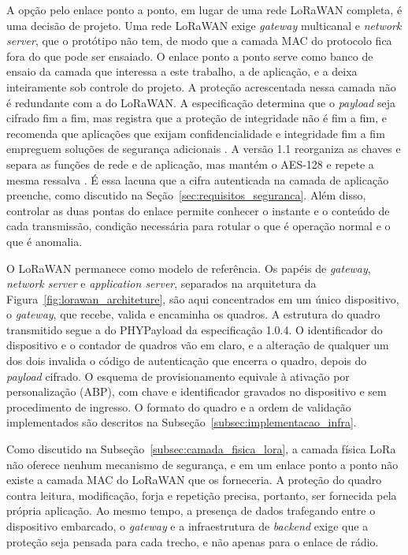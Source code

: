 A opção pelo enlace ponto a ponto, em lugar de uma rede LoRaWAN completa, é uma decisão de projeto. Uma rede LoRaWAN exige \textit{gateway} multicanal e \textit{network server}, que o protótipo não tem, de modo que a camada MAC do protocolo fica fora do que pode ser ensaiado. O enlace ponto a ponto serve como banco de ensaio da camada que interessa a este trabalho, a de aplicação, e a deixa inteiramente sob controle do projeto. A proteção acrescentada nessa camada não é redundante com a do LoRaWAN. A especificação determina que o \textit{payload} seja cifrado fim a fim, mas registra que a proteção de integridade não é fim a fim, e recomenda que aplicações que exijam confidencialidade e integridade fim a fim empreguem soluções de segurança adicionais \cite{lorawan104}. A versão 1.1 reorganiza as chaves e separa as funções de rede e de aplicação, mas mantém o AES-128 e repete a mesma ressalva \cite{lorawan11}. É essa lacuna que a cifra autenticada na camada de aplicação preenche, como discutido na Seção~\ref{sec:requisitos_seguranca}. Além disso, controlar as duas pontas do enlace permite conhecer o instante e o conteúdo de cada transmissão, condição necessária para rotular o que é operação normal e o que é anomalia.

O LoRaWAN permanece como modelo de referência. Os papéis de \textit{gateway}, \textit{network server} e \textit{application server}, separados na arquitetura da Figura~\ref{fig:lorawan_architeture}, são aqui concentrados em um único dispositivo, o \textit{gateway}, que recebe, valida e encaminha os quadros. A estrutura do quadro transmitido segue a do PHYPayload da especificação 1.0.4. O identificador do dispositivo e o contador de quadros vão em claro, e a alteração de qualquer um dos dois invalida o código de autenticação que encerra o quadro, depois do \textit{payload} cifrado. O esquema de provisionamento equivale à ativação por personalização (ABP), com chave e identificador gravados no dispositivo e sem procedimento de ingresso. O formato do quadro e a ordem de validação implementados são descritos na Subseção~\ref{subsec:implementacao_infra}.

Como discutido na Subseção~\ref{subsec:camada_fisica_lora}, a camada física LoRa não oferece nenhum mecanismo de segurança, e em um enlace ponto a ponto não existe a camada MAC do LoRaWAN que os forneceria. A proteção do quadro contra leitura, modificação, forja e repetição precisa, portanto, ser fornecida pela própria aplicação. Ao mesmo tempo, a presença de dados trafegando entre o dispositivo embarcado, o \textit{gateway} e a infraestrutura de \textit{backend} exige que a proteção seja pensada para cada trecho, e não apenas para o enlace de rádio.

